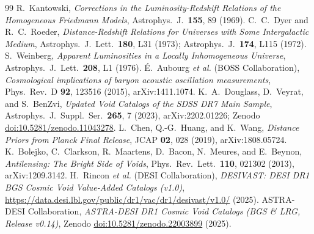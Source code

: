 \documentclass[11pt,a4paper]{article}
\begin{document}
\begin{thebibliography}{99}
 R.~Kantowski, \textit{Corrections in the Luminosity-Redshift Relations of the Homogeneous Friedmann Models}, Astrophys.\ J.\ \textbf{155}, 89 (1969).
 C.~C.~Dyer and R.~C.~Roeder, \textit{Distance-Redshift Relations for Universes with Some Intergalactic Medium}, Astrophys.\ J.\ Lett.\ \textbf{180}, L31 (1973); Astrophys.\ J.\ \textbf{174}, L115 (1972).
 S.~Weinberg, \textit{Apparent Luminosities in a Locally Inhomogeneous Universe}, Astrophys.\ J.\ Lett.\ \textbf{208}, L1 (1976).
 \'E.~Aubourg \textit{et al.} (BOSS Collaboration), \textit{Cosmological implications of baryon acoustic oscillation measurements}, Phys.\ Rev.\ D \textbf{92}, 123516 (2015), arXiv:1411.1074.
 K.~A.~Douglass, D.~Veyrat, and S.~BenZvi, \textit{Updated Void Catalogs of the SDSS DR7 Main Sample}, Astrophys.\ J.\ Suppl.\ Ser.\ \textbf{265}, 7 (2023), arXiv:2202.01226; Zenodo \href{https://doi.org/10.5281/zenodo.11043278}{doi:10.5281/zenodo.11043278}.
 L.~Chen, Q.-G.~Huang, and K.~Wang, \textit{Distance Priors from Planck Final Release}, JCAP \textbf{02}, 028 (2019), arXiv:1808.05724.
 K.~Bolejko, C.~Clarkson, R.~Maartens, D.~Bacon, N.~Meures, and E.~Beynon, \textit{Antilensing: The Bright Side of Voids}, Phys.\ Rev.\ Lett.\ \textbf{110}, 021302 (2013), arXiv:1209.3142.
 H.~Rincon \textit{et al.} (DESI Collaboration), \textit{DESIVAST: DESI DR1 BGS Cosmic Void Value-Added Catalogs (v1.0)}, \url{https://data.desi.lbl.gov/public/dr1/vac/dr1/desivast/v1.0/} (2025).
 ASTRA-DESI Collaboration, \textit{ASTRA-DESI DR1 Cosmic Void Catalogs (BGS \& LRG, Release v0.14)}, Zenodo \href{https://doi.org/10.5281/zenodo.22003899}{doi:10.5281/zenodo.22003899} (2025).
\end{thebibliography}
\end{document}
